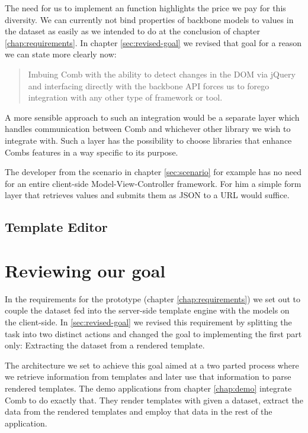 \documentclass[thesis.tex]{subfiles}
\begin{document}
The need for us to implement an  function highlights the
price we pay for this diversity. We can currently not bind properties of
backbone models to values in the dataset as easily as we intended to do at the
conclusion of chapter \ref{chap:requirements}. In chapter \ref{sec:revised-goal}
we revised that goal for a reason we can state more clearly now:
\begin{quote}
Imbuing Comb with the ability to detect changes in the DOM via jQuery and
interfacing directly with the backbone API forces us to forego integration with
any other type of framework or tool.
\end{quote}
A more sensible approach to such an integration would be a separate layer which
handles communication between Comb and whichever other library we wish to
integrate with. Such a layer has the possibility to choose libraries that
enhance Combs features in a way specific to its purpose.

The developer from the scenario in chapter \ref{sec:scenario} for example has
no need for an entire client-side Model-View-Controller framework.
For him a simple form layer that retrieves values and submits them as JSON to a
URL would suffice.


\subsection{Template Editor}


\section{Reviewing our goal}
In the requirements for the prototype (chapter \ref{chap:requirements})
we set out to couple the dataset fed into the server-side template engine with
the models on the client-side. In \ref{sec:revised-goal} we revised this
requirement by splitting the task into two distinct actions and changed the goal
to implementing the first part only: Extracting the dataset from a rendered
template.

The architecture we set to achieve this goal aimed at a two parted process where
we retrieve information from templates and later use that information to parse
rendered templates. The demo applications from chapter \ref{chap:demo}
integrate Comb to do exactly that. They render templates with given a dataset,
extract the data from the rendered templates and employ that data in the rest of
the application.
\end{document}
